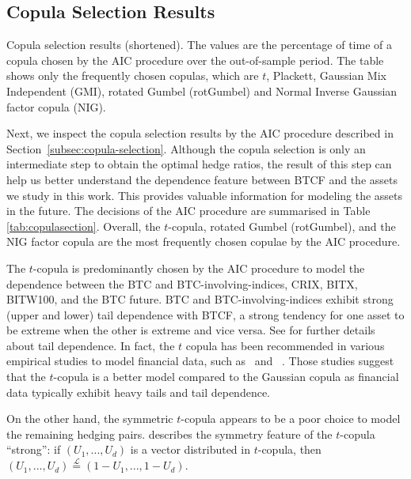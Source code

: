 \documentclass[11pt,a4paper,english]{article}
\begin{document}
\subsection{Copula Selection Results}\label{subsec:-copula-results}
\begin{table}[t]
  \centering

 \caption{Copula selection results (shortened).
        The values are the percentage of time of a copula chosen by
        the AIC procedure over the out-of-sample period. 
        The table shows only the frequently chosen copulas, which are
        $t$, Plackett, Gaussian Mix Independent (GMI), rotated Gumbel
        (rotGumbel) and Normal Inverse Gaussian factor copula (NIG). 
        }
    \label{tab:copulasection}
\end{table}
Next, we inspect the copula selection results by the AIC procedure
described in Section~\ref{subsec:copula-selection}. 
Although the copula selection is only an intermediate step to obtain
the optimal hedge ratios,
the result of this step can help us better understand the dependence
feature between BTCF and the assets we study in this work.
This provides valuable information for modeling the assets in the future.
The decisions of the AIC procedure are summarised in Table
\ref{tab:copulasection}. Overall, the $t$-copula, rotated Gumbel
(rotGumbel), and the NIG factor copula are the most frequently chosen
copulae by the AIC procedure.

The $t$-copula is predominantly chosen by the AIC procedure to model the dependence between 
the BTC and BTC-involving-indices, CRIX, BITX, BITW100, and the BTC
future.
BTC and BTC-involving-indices exhibit strong (upper and lower) tail
dependence with BTCF, a strong tendency for one asset to be extreme when the other is extreme and
vice versa. 
See \cite{McNeil2015} for further details about tail dependence.
In fact, the $t$ copula has been recommended in various empirical
studies to model financial data, such as~\cite{zeevi2002beyond} and~
\cite{breymann2003dependence}.
Those studies suggest that the $t$-copula is a better model compared
to the Gaussian copula as financial data typically exhibit heavy tails
and tail dependence. 

On the other hand, the symmetric $t$-copula appears to be 
a poor choice to model the remaining hedging pairs. 
\cite{demarta2005t} describes the symmetry feature of the $t$-copula ``strong'':
if $(U_1, ..., U_d)$ is a vector distributed in $t$-copula,
then $(U_1, ..., U_d) \overset{\mathcal{L}}= (1-U_1, ...,1-U_d)$.
\end{document}
